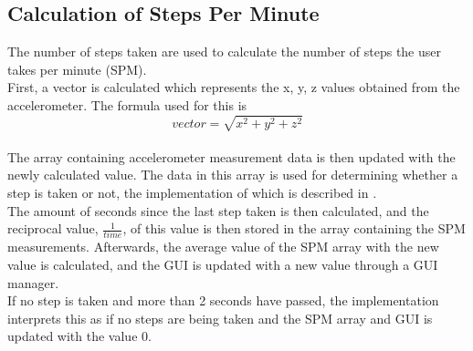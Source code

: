 \subsection{Calculation of Steps Per Minute}
The number of steps taken are used to calculate the number of steps the user takes per minute (SPM).\\

First, a vector is calculated which represents the x, y, z values obtained from the accelerometer. The formula used for this is $$vector = \sqrt{x^{2} + y^{2} + z^{2}}$$\\

The array containing accelerometer measurement data is then updated with the newly calculated value. The data in this array is used for determining whether a step is taken or not, the implementation of which is described in .\\

The amount of seconds since the last step taken is then calculated, and the reciprocal value, $\frac{1}{time}$, of this value is then stored in the array containing the SPM measurements. Afterwards, the average value of the SPM array with the new value is calculated, and the GUI is updated with a new value through a GUI manager.\\

If no step is taken and more than 2 seconds have passed, the implementation interprets this as if no steps are being taken and the SPM array and GUI is updated with the value 0.